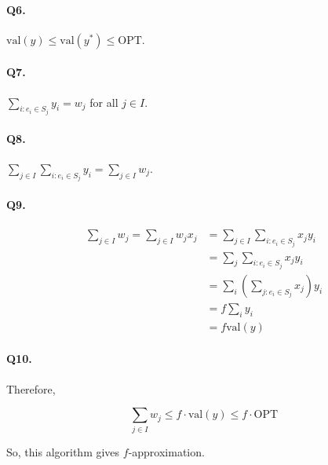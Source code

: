 \documentclass{article}
\begin{document}
\paragraph{Q6. }

$\text{val}(y) \le \text{val}(y^*) \le \text{OPT}$. 

\paragraph{Q7. }

$\sum_{i: e_i \in S_j} y_i = w_j$ for all $j \in I$. 

\paragraph{Q8. }

$\sum_{j \in I} \sum_{i: e_i \in S_j} y_i = \sum_{j \in I} w_j$. 

\paragraph{Q9. }

\begin{align*}
  \sum_{j \in I} w_j = \sum_{j \in I} w_j x_j &= \sum_{j \in I} \sum_{i: e_i \in S_j} x_j y_i \\
                                              &= \sum_{j} \sum_{i: e_i \in S_j} x_j y_i \\
                                              &= \sum_{i} \left( \sum_{j: e_i \in S_j} x_j \right) y_i \\
                                              &= f \sum_{i} y_i \\
                                              &= f \text{val}(y)
\end{align*}

\paragraph{Q10. }

Therefore,

\[  \sum_{j \in I} w_j \le f \cdot \text{val}(y) \le f \cdot \text{OPT}\]

So, this algorithm gives $f$-approximation.
\end{document}
